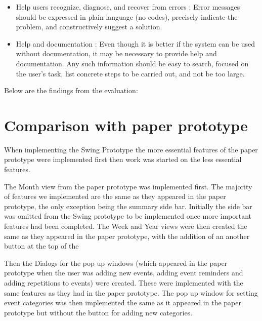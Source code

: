 \documentclass{article}
\begin{document}
\begin{itemize}
\item Help users recognize, diagnose, and recover from errors : Error messages should be expressed in plain language (no codes), precisely indicate the problem, and constructively suggest a solution. 
    
\item Help and documentation : Even though it is better if the system can be used without documentation, it may be necessary to provide help and documentation. Any such information should be easy to search, focused on the user's task, list concrete steps to be carried out, and not be too large.    
\end{itemize}

Below are the findings from the evaluation:



\section{Comparison with paper prototype}

When implementing the Swing Prototype the more essential features of the
paper prototype were implemented first then work was started on the less
essential features.

The Month view from the paper prototype was implemented first. The
majority of features we implemented are the same as they appeared in the
paper prototype, the only exception being the summary side bar.
Initially the side bar was omitted from the Swing prototype to be
implemented once more important features had been completed. %
The Week and Year views were then created the same as they appeared in the paper
prototype, with the addition of an another button at the top of the

Then the Dialogs for the pop up windows (which appeared in the paper
prototype when the user was adding new events, adding event
reminders and adding repetitions to events) were created. These were
implemented with the same features as they had in the paper prototype. 
The pop up window for setting event categories was then implemented the
same as it appeared in the paper prototype but without the button for 
adding new categories.
\end{document}
